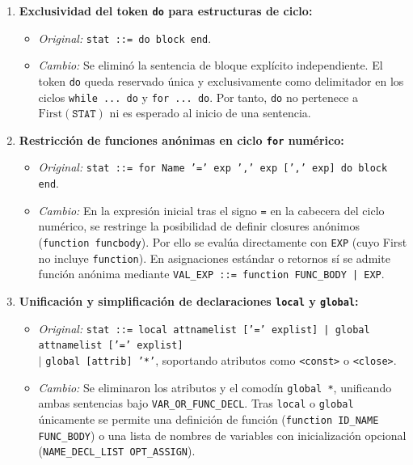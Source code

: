 \documentclass[10pt,letterpaper]{article}
\begin{document}
\begin{enumerate}
  \item \textbf{Exclusividad del token \texttt{do} para estructuras de ciclo:}
  \begin{itemize}
    \item \textit{Original:} \texttt{stat ::= do block end}.
    \item \textit{Cambio:} Se eliminó la sentencia de bloque explícito independiente. El token \texttt{do} queda reservado única y exclusivamente como delimitador en los ciclos \texttt{while ... do} y \texttt{for ... do}. Por tanto, \texttt{do} no pertenece a $\text{First}(\texttt{STAT})$ ni es esperado al inicio de una sentencia.
  \end{itemize}

  \item \textbf{Restricción de funciones anónimas en ciclo \texttt{for} numérico:}
  \begin{itemize}
    \item \textit{Original:} \texttt{stat ::= for Name '=' exp ',' exp [',' exp] do block end}.
    \item \textit{Cambio:} En la expresión inicial tras el signo \texttt{=} en la cabecera del ciclo numérico, se restringe la posibilidad de definir closures anónimos (\texttt{function funcbody}). Por ello se evalúa directamente con \texttt{EXP} (cuyo First no incluye \texttt{function}). En asignaciones estándar o retornos sí se admite función anónima mediante \texttt{VAL\_EXP ::= function FUNC\_BODY | EXP}.
  \end{itemize}

  \item \textbf{Unificación y simplificación de declaraciones \texttt{local} y \texttt{global}:}
  \begin{itemize}
    \item \textit{Original:} \texttt{stat ::= local attnamelist ['=' explist] | global attnamelist ['=' explist]} \\
    \hspace*{1.2em} $\mid$ \texttt{global [attrib] '*'}, soportando atributos como \texttt{<const>} o \texttt{<close>}.
    \item \textit{Cambio:} Se eliminaron los atributos y el comodín \texttt{global *}, unificando ambas sentencias bajo \texttt{VAR\_OR\_FUNC\_DECL}. Tras \texttt{local} o \texttt{global} únicamente se permite una definición de función (\texttt{function ID\_NAME FUNC\_BODY}) o una lista de nombres de variables con inicialización opcional (\texttt{NAME\_DECL\_LIST OPT\_ASSIGN}).
  \end{itemize}


\end{enumerate}
\end{document}
